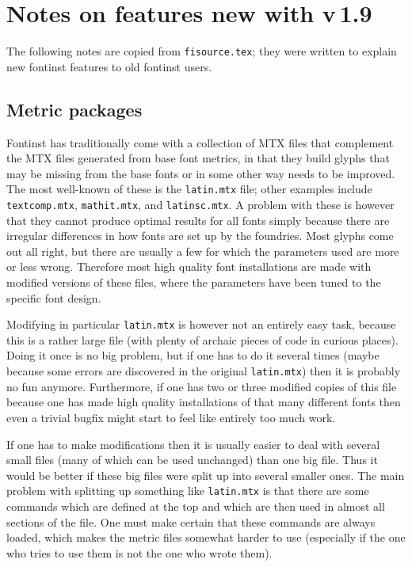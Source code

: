 \documentclass[a4paper]{ltxguide}
\newcommand*{\setpackagename}[1]{\textsf{#1}}
\newcommand{\fontinst}{\setpackagename{font\-inst}\xspace}
\newcommand{\Fontinst}{\setpackagename{Font\-inst}\xspace}
\begin{document}
\section{Notes on features new with v\,1.9}

The following notes are copied from \texttt{fisource.tex}; they were 
written to explain new \fontinst features to old \fontinst users.


\subsection{Metric packages}

\Fontinst has traditionally come with a collection of MTX 
files that complement the MTX files generated from base font metrics, 
in that they build glyphs that may be missing from the base fonts or 
in some other way needs to be improved. The most well-known of these 
is the \texttt{latin.mtx} file; other examples include 
\texttt{textcomp.mtx}, \texttt{mathit.mtx}, and \texttt{latinsc.mtx}. 
A problem with these is however that they cannot produce optimal 
results for all fonts simply because there are irregular differences 
in how fonts are set up by the foundries. Most glyphs come out all right, 
but there are usually a few for which the parameters used are more or 
less wrong. Therefore most high quality font installations are made 
with modified versions of these files, where the parameters have been 
tuned to the specific font design.

Modifying in particular \texttt{latin.mtx} is however not an entirely 
easy task, because this is a rather large file (with plenty of 
archaic pieces of code in curious places). Doing it once is no big 
problem, but if one has to do it several times (maybe because some 
errors are discovered in the original \texttt{latin.mtx}) then it is 
probably no fun anymore. Furthermore, if one has two or three 
modified copies of this file because one has made high quality 
installations of that many different fonts then even a trivial bugfix 
might start to feel like entirely too much work.

If one has to make modifications then it is usually easier to deal 
with several small files (many of which can be used unchanged) than 
one big file. Thus it would be better if these big files were split up 
into several smaller ones.
The main problem with splitting up something like \texttt{latin.mtx}
is that there are some commands which are defined at the top and 
which are then used in almost all sections of the file. One must make 
certain that these commands are always loaded, which makes the metric 
files somewhat harder to use (especially if the one who tries to use 
them is not the one who wrote them).
\end{document}
